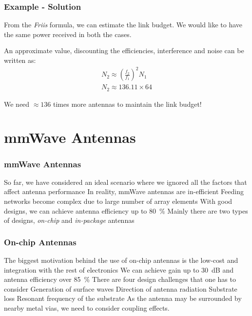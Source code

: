 \documentclass[10pt]{beamer}
\begin{document}
\begin{frame}
    \frametitle{Example - Solution}

    From the \textit{Friis} formula, we can estimate the link budget. We would like to have the same power received in both the cases.

    An approximate value, discounting the efficiencies, interference and noise can be written as:
    \begin{align*}
        N_2 \approx \left(\frac{f_2}{f_1}\right)^2 N_1 \\
        N_2 \approx 136.11 \times 64
    \end{align*}

    We need $\approx 136$ times more antennas to maintain the link budget!
\end{frame}

\section{mmWave Antennas}

\begin{frame}
    \frametitle{mmWave Antennas}

    \begin{outline}
        \1 So far, we have considered an ideal scenario where we ignored all the factors that affect antenna performance
        \2 In reality, mmWave antennas are in-efficient
        \2 Feeding networks become complex due to large number of array elements
        \1 With good designs, we can achieve antenna efficiency up to \SI{80}{\percent}
        \1 Mainly there are two types of designs, \textit{on-chip} and \textit{in-package} antennas
    \end{outline}
\end{frame}

\begin{frame}
    \frametitle{On-chip Antennas}
    \begin{outline}
        \1 The biggest motivation behind the use of on-chip antennas is the low-cost and integration with the rest of electronics
        \1 We can achieve gain up to \SI{30}{\dB} and antenna efficiency over \SI{85}{\percent}
        \1 There are four design challenges that one has to consider
        \2 Generation of surface waves
        \2 Direction of antenna radiation
        \2 Substrate loss
        \2 Resonant frequency of the substrate
        \1 As the antenna may be surrounded by nearby metal vias, we need to consider coupling effects.
    \end{outline}
\end{frame}
\end{document}
